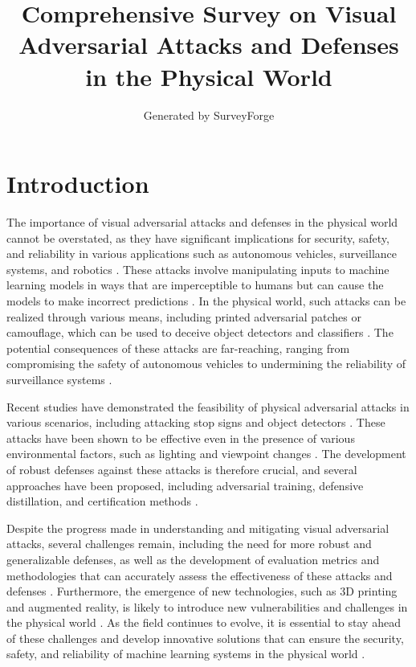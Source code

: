 \documentclass[11pt,a4paper]{article}
\title{Comprehensive Survey on Visual Adversarial Attacks and Defenses in the Physical World}
\author{Generated by SurveyForge}
\date{}
\begin{document}
\maketitle
\tableofcontents
\newpage



\section{Introduction}


The importance of visual adversarial attacks and defenses in the physical world cannot be overstated, as they have significant implications for security, safety, and reliability in various applications such as autonomous vehicles, surveillance systems, and robotics \cite{doi:10.24963/ijcai.2021/694,doi:10.1007/s11633-019-1211-x}. These attacks involve manipulating inputs to machine learning models in ways that are imperceptible to humans but can cause the models to make incorrect predictions \cite{doi:10.1145/3128572.3140444}. In the physical world, such attacks can be realized through various means, including printed adversarial patches or camouflage, which can be used to deceive object detectors and classifiers \cite{arxiv:1707.08945,arxiv:1712.09665}. The potential consequences of these attacks are far-reaching, ranging from compromising the safety of autonomous vehicles to undermining the reliability of surveillance systems \cite{doi:10.1007/978-3-030-10925-7_4,arxiv:1906.11897}.

Recent studies have demonstrated the feasibility of physical adversarial attacks in various scenarios, including attacking stop signs \cite{arxiv:1707.08945} and object detectors \cite{doi:10.1007/978-3-030-58574-7_41}. These attacks have been shown to be effective even in the presence of various environmental factors, such as lighting and viewpoint changes \cite{doi:10.1109/tnnls.2023.3321432,doi:10.1109/tpami.2024.3430860}. The development of robust defenses against these attacks is therefore crucial, and several approaches have been proposed, including adversarial training, defensive distillation, and certification methods \cite{doi:10.1109/iccv48922.2021.01542,arxiv:2003.06693,arxiv:1902.06705}.

Despite the progress made in understanding and mitigating visual adversarial attacks, several challenges remain, including the need for more robust and generalizable defenses, as well as the development of evaluation metrics and methodologies that can accurately assess the effectiveness of these attacks and defenses \cite{arxiv:1902.06705,doi:10.1109/access.2022.3216291}. Furthermore, the emergence of new technologies, such as 3D printing and augmented reality, is likely to introduce new vulnerabilities and challenges in the physical world \cite{doi:10.1109/tpami.2024.3430860,doi:10.1016/j.ins.2023.03.084}. As the field continues to evolve, it is essential to stay ahead of these challenges and develop innovative solutions that can ensure the security, safety, and reliability of machine learning systems in the physical world \cite{doi:10.1016/j.eng.2019.12.012,arxiv:1810.00069}.
\end{document}
